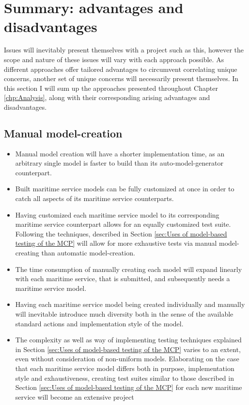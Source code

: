 \section{Summary: advantages and disadvantages} 

Issues will inevitably present themselves with a project such as this, however the scope and nature of these issues will vary with each approach possible. As different approaches offer tailored advantages to circumvent correlating unique concerns, another set of unique concerns will necessarily present themselves. In this section I will sum up the approaches presented throughout Chapter \ref{chp:Analysis}, along with their corresponding arising advantages and disadvantages.
\subsection{Manual model-creation}
\begin{itemize}
	\item Manual model creation will have a shorter implementation time, as an arbitrary single model is faster to build than its auto-model-generator counterpart. 
	\item Built maritime service models can be fully customized at once in order to catch all aspects of its maritime service counterparts.
	\item Having customized each maritime service model to its corresponding maritime service counterpart allows for an equally customized test suite. Following the techniques, described in Section \ref{sec:Uses of model-based testing of the MCP} will allow for more exhaustive tests via manual model-creating than automatic model-creation.
\end{itemize}
\begin{itemize}
	\item The time consumption of manually creating each model will expand linearly with each maritime service, that is submitted, and subsequently needs a maritime service model. 
	\item Having each maritime service model being created individually and manually will inevitable introduce much diversity both in the sense of the available standard actions and implementation style of the model.
	\item The complexity as well as way of implementing testing techniques explained in Section \ref{sec:Uses of model-based testing of the MCP} varies to an extent, even without consideration of non-uniform models. Elaborating on the case that each maritime service model differs both in purpose, implementation style and exhaustiveness, creating test suites similar to those described in Section \ref{sec:Uses of model-based testing of the MCP} for each new maritime service will become an extensive project
\end{itemize}
